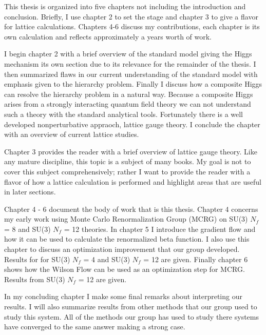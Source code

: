 This thesis is organized into five chapters not including the introduction and conclusion.
Briefly, I use chapter 2 to set the stage and chapter 3 to give a flavor for lattice calculations.
Chapters 4-6 discuss my contributions, each chapter is its own calculation and reflects approximately a years worth of work.

I begin chapter 2 with a brief overview of the standard model giving the Higgs mechanism its own section due to its relevance for the remainder of the thesis.
I then summarized flaws in our current understanding of the standard model with emphasis given to the hierarchy problem.
Finally I discuss how a composite Higgs can resolve the hierarchy problem in a natural way.
Because a composite Higgs arises from a strongly interacting quantum field theory we can not understand such a theory with the standard analytical tools.
Fortunately there is a well developed nonperturbative appraoch, lattice gauge theory.
I conclude the chapter with an overview of current lattice studies.

Chapter 3 provides the reader with a brief overview of lattice gauge theory.  
Like any mature discipline, this topic is a subject of many books.
My goal is not to cover this subject comprehensively; rather I want to provide the reader with a flavor of how a lattice calculation is performed and highlight areas that are useful in later sections.

Chapter 4 - 6 document the body of work that is this thesis.
Chapter 4 concerns my early work using Monte Carlo Renormalization Group (MCRG) on SU(3) $N_f$ = 8 and SU(3) $N_f$ = 12 theories.
In chapter 5 I introduce the gradient flow and how it can be used to calculate the renormalized beta function.
I also use this chapter to discuss an optimization improvement that our group developed.
Results for for SU(3) $N_f$ = 4 and SU(3) $N_f$ = 12 are given.
Finally chapter 6 shows how the Wilson Flow can be used as an optimization step for MCRG.
Results from SU(3) $N_f$ = 12 are given.

In my concluding chapter I make some final remarks about interpreting our results.
I will also summarize results from other methods that our group used to study this system.
All of the methods our group has used to study there systems have converged to the same answer making a strong case.
